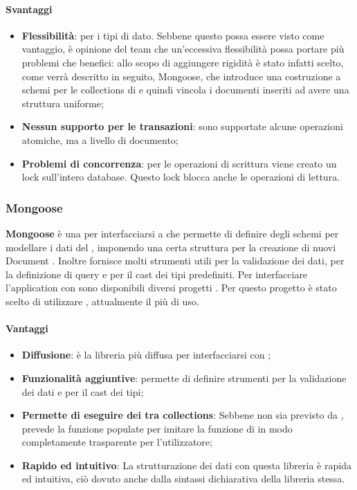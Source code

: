 \paragraph{Svantaggi}
\begin{itemize}
\item \textbf{Flessibilità}: per i tipi di dato. Sebbene questo possa essere visto come vantaggio,
è opinione del team che un’eccessiva flessibilità possa portare più problemi che
benefici: allo scopo di aggiungere rigidità è stato infatti scelto, come verrà descritto
in seguito, Mongoose, che introduce una costruzione a schemi per le collections di
 e quindi vincola i documenti inseriti ad avere una struttura uniforme;
\item \textbf{Nessun supporto per le transazioni}: sono supportate alcune operazioni atomiche,
ma a livello di documento;
\item \textbf{Problemi di concorrenza}: per le operazioni di scrittura viene creato un lock
sull’intero database. Questo lock blocca anche le operazioni di lettura.
\end{itemize}
	\subsubsection{Mongoose}
\textbf{Mongoose} è una  per interfacciarsi a  che permette di definire degli schemi per modellare i dati del , imponendo una certa struttura per la creazione di nuovi Document . Inoltre fornisce molti strumenti utili per la validazione dei dati, per la definizione di query e per il cast dei tipi predefiniti.
Per interfacciare l'application  con  sono disponibili diversi progetti . Per questo progetto è stato scelto di utilizzare  , attualmente il più di uso.

\paragraph{Vantaggi}
\begin{itemize}
\item \textbf{Diffusione}: è la libreria più diffusa per interfacciarsi con ;
\item \textbf{Funzionalità aggiuntive}: permette di definire strumenti per la validazione dei
dati e per il cast dei tipi;
\item \textbf{Permette di eseguire dei  tra collections}: Sebbene non sia previsto da
,  prevede la funzione populate per imitare la funzione di  in modo completamente trasparente per l’utilizzatore;
\item \textbf{Rapido ed intuitivo}: La strutturazione dei dati con questa libreria è rapida ed
intuitiva, ciò dovuto anche dalla sintassi dichiarativa della libreria stessa.
\end{itemize}

